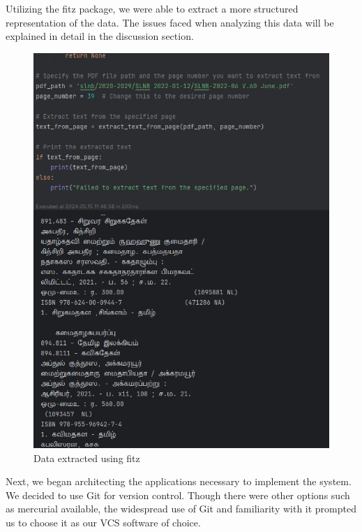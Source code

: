 Utilizing the fitz package, we were able to extract a more structured representation of the data. The issues faced when analyzing this data will be explained in detail in the discussion section.

\begin{figure}[htbp]
    \centering
    \includegraphics[width=1\textwidth]{../../assets/extracted.png}
    \caption{Data extracted using fitz}
    \label{fig:extracted}
\end{figure}

\newpage

Next, we began architecting the applications necessary to implement the system. We decided to use Git for version control. Though there were other options such as mercurial available, the widespread use of Git and familiarity with it prompted us to choose it as our VCS software of choice.